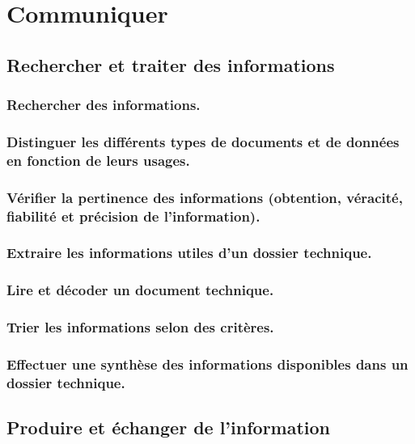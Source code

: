 \documentclass[10pt,fleqn]{book}
\begin{document}
\chapter{Communiquer} 

\section{Rechercher et traiter des informations} 

\subsection{Rechercher des informations.} 

\subsection{Distinguer les différents types de documents et de données en fonction de leurs usages.} 

\subsection{Vérifier la pertinence des informations (obtention, véracité, fiabilité et précision de l'information).} 

\subsection{Extraire les informations utiles d’un dossier technique.} 

\subsection{Lire et décoder un document technique.} 

\subsection{Trier les informations selon des critères.} 

\subsection{Effectuer une synthèse des informations disponibles dans un dossier technique.} 

\section{Produire et échanger de l'information} 
\end{document}
